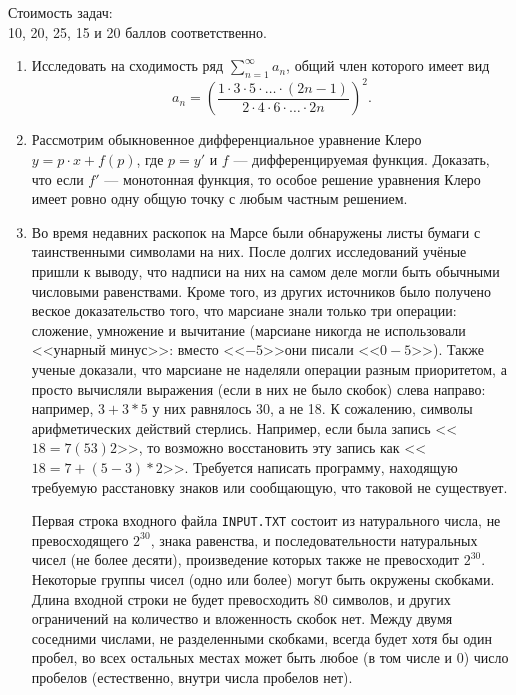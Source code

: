 \begin{flushright}
Стоимость задач: \\
10, 20, 25, 15 и 20 баллов соответственно.\\
\end{flushright}

\begin{enumerate}
\item Исследовать на сходимость ряд $\sum\limits_{n=1}^{\infty} a_n$, общий член которого имеет вид 
$$a_n = \left( \frac{1 \cdot 3 \cdot 5 \cdot \ldots \cdot (2n - 1)}{2 \cdot 4 \cdot 6 \cdot \ldots \cdot 2n} \right)^2.$$

\item Рассмотрим обыкновенное дифференциальное уравнение Клеро $y = p \cdot x + f(p)$, где $p = y'$ и $f$ --- дифференцируемая функция. Доказать, что если $f'$ --- монотонная функция, то особое решение уравнения Клеро имеет ровно одну общую точку с любым частным решением.

\item Во время недавних раскопок на Марсе были обнаружены листы бумаги с таинственными символами на них. После долгих исследований учёные пришли к выводу, что надписи на них на самом деле могли быть обычными числовыми равенствами. Кроме того, из других источников было получено веское доказательство того, что марсиане знали только три операции: сложение, умножение и вычитание (марсиане никогда не использовали <<унарный минус>>: вместо <<$-5$>>они писали <<$0-5$>>). Также ученые доказали, что марсиане не наделяли операции разным приоритетом, а просто вычисляли выражения (если в них не было скобок) слева направо: например, $3+3*5$ у них равнялось 30, а не 18. К сожалению, символы арифметических действий стерлись. Например, если была запись <<$18=7 (5 3) 2$>>, то возможно восстановить эту запись как <<$18=7+(5-3)*2$>>. Требуется написать программу, находящую требуемую расстановку знаков или сообщающую, что таковой не существует.

Первая строка входного файла {\tt INPUT.TXT} состоит из натурального числа, не превосходящего $2^{30}$, знака равенства, и последовательности натуральных чисел (не более десяти), произведение которых также не превосходит $2^{30}$. Некоторые группы чисел (одно или более) могут быть окружены скобками. Длина входной строки не будет превосходить 80 символов, и других ограничений на количество и вложенность скобок нет. Между двумя соседними числами, не разделенными скобками, всегда будет хотя бы один пробел, во всех остальных местах может быть любое (в том числе и 0) число пробелов (естественно, внутри числа пробелов нет).


\end{enumerate}
